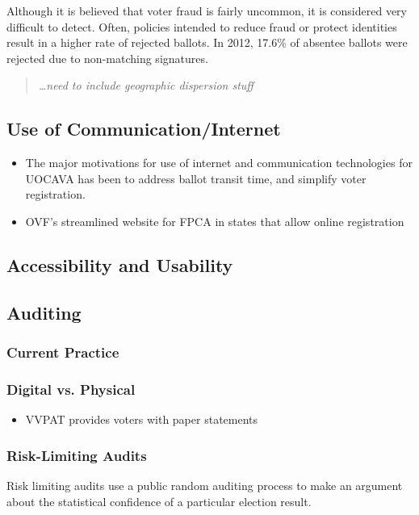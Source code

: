 Although it is believed that voter fraud is fairly uncommon, it is considered very difficult to detect. Often, policies intended to reduce fraud or protect identities result in a higher rate of rejected ballots. In 2012, 17.6\% of absentee ballots were rejected due to non-matching signatures.

\begin{quote} {\em \ldots need to include geographic dispersion stuff}\end{quote}

\subsection{Use of Communication/Internet}

\begin{itemize}
\item The major motivations for use of internet and communication technologies for UOCAVA has been to address ballot transit time, and simplify voter registration. 
\item OVF's streamlined website for FPCA in states that allow online registration
\end{itemize}

\subsection{Accessibility and Usability}
\subsection{Auditing}
\subsubsection{Current Practice}
\subsubsection{Digital vs. Physical}
\begin{itemize}
\item VVPAT provides voters with paper statements
\end{itemize}
\subsubsection{Risk-Limiting Audits}
Risk limiting audits use a public random auditing process to make an argument about the statistical confidence of a particular election result.
